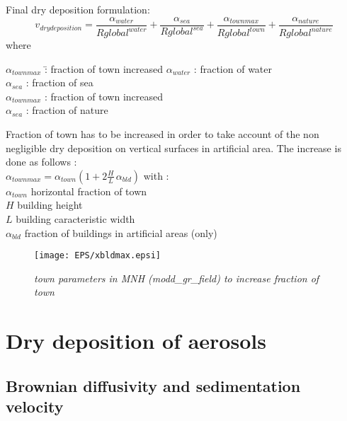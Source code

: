 Final dry deposition formulation:
$$
v_{dry deposition} = \frac{\alpha_{water}}{Rglobal^{water}} +
\frac{\alpha_{sea}}{Rglobal^{sea}} +
\frac{\alpha_{townmax}}{Rglobal^{town}} +
\frac{\alpha_{nature}}{Rglobal^{nature}}
$$
where\\ 
\begin{tabbing}
$\alpha_{townmax}$ \=: fraction of town increased \kill
$\alpha_{water}$ \> : fraction of water \\
$\alpha_{sea}$ \> : fraction of sea \\
$\alpha_{townmax}$ \> : fraction of town increased \\
$\alpha_{sea}$ \> : fraction of nature 
\end{tabbing}
Fraction of town has to be increased in order to take account of the non
negligible dry deposition on vertical surfaces in artificial
area. The increase is done as follows :\\
$\alpha_{townmax} = \alpha_{town} (1+2 \frac{H}{L} \, \alpha_{bld})$
with : \\
$\alpha_{town}$ horizontal fraction of town \\
$H$ building height \\
$L$ building caracteristic width \\
$\alpha_{bld}$ fraction of buildings in artificial areas (only)
\begin{figure}[hbp]
\begin{center}
\texttt{[image: EPS/xbldmax.epsi]}
\end{center}
\label{bld}
\caption{\sl{town parameters in MNH (modd\_gr\_field) to increase
fraction of town}} 
\end{figure}

\section{Dry deposition of aerosols}
\subsection*{Brownian diffusivity and sedimentation velocity}

